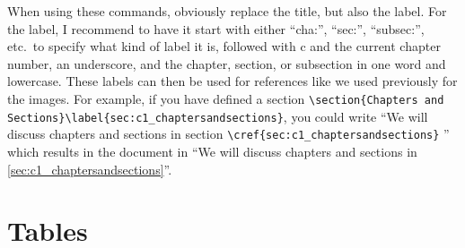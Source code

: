 When using these commands, obviously replace the title, but also the label. For
the label, I recommend to have it start with either ``cha:'', ``sec:'',
``subsec:'', etc.\ to specify what kind of label it is, followed with c and the
current chapter number, an underscore, and the chapter, section, or subsection
in one word and lowercase. These labels can then be used for references like we
used previously for the images. For example, if you have defined a section
\lstinline[language=Tex]!\section{Chapters and Sections}\label{sec:c1_chaptersandsections}!, 
you could write ``We will discuss chapters and sections in section
\lstinline[language=Tex]!\cref{sec:c1_chaptersandsections}!
'' which results in
the document in ``We will discuss chapters and sections in
\cref{sec:c1_chaptersandsections}''.


\section{Tables}\label{sec:c1_tables}

